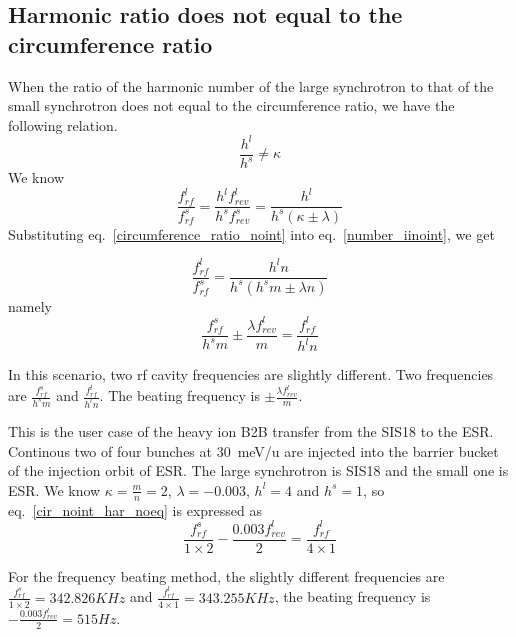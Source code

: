 \subsection{Harmonic ratio does not equal to the circumference ratio} 
When the ratio of the harmonic number of the large synchrotron to that of the small synchrotron does not equal to the circumference ratio, we have the following relation.
\begin{equation}
\frac {h^{l}}{h^{s}}\neq \kappa  \label{harmonic_1_iinoint}
\end{equation}
We know 
\begin{equation}
\frac {f_{rf}^{l}}{f_{rf}^{s}}= \frac {h^l f_{rev}^{l}}{h^s f_{rev}^{s}} =\frac {h^l}{h^s (\kappa\pm \lambda)}\label{number_iinoint}
\end{equation}
Substituting eq.~\ref{circumference_ratio_noint} into eq.~\ref{number_iinoint}, we get

\begin{equation}
\frac {f_{rf}^{l}}{f_{rf}^{s}}= \frac {h^l n}{h^s(h^s m\pm \lambda n)}\label{number_iinoint}
\end{equation}
namely 
\begin{equation}
\frac {f_{rf}^{s}}{h^s m}\pm\frac{\lambda f_{rev}^{l}}{m}= \frac {f_{rf}^{l}}{h^l n}\label{cir_noint_har_noeq}
\end{equation}

In this scenario, two rf cavity frequencies are slightly different. Two frequencies are $\frac {f_{rf}^{s}}{h^s m}$ and $\frac {f_{rf}^{l}}{h^l n}$. The  beating frequency is $\pm\frac{\lambda f_{rev}^{l}}{m}$. 

This is the user case of the heavy ion B2B transfer from the SIS18 to the ESR. Continous two of four bunches at \SI{30}{meV/\atomicmassunit} are injected into the barrier bucket of the injection orbit of ESR. The large synchrotron is SIS18 and the small one is ESR. We know $\kappa=\frac{m}{n}=2$, $\lambda=-0.003$, $h^l=4$ and $h^s=1$, so eq.~\ref{cir_noint_har_noeq} is expressed as
\begin{equation}
\frac {f_{rf}^{s}}{1 \times 2}-\frac{0.003 f_{rev}^{l}}{2}= \frac {f_{rf}^{l}}{4 \times 1}
\end{equation}

For the frequency beating method, the slightly different frequencies are $\frac {f_{rf}^{s}}{1 \times 2}=342.826KHz$ and $\frac {f_{rf}^{l}}{4 \times 1}=343.255KHz$, the beating frequency is $-\frac{0.003 f_{rev}^{l}}{2}=515Hz$.


